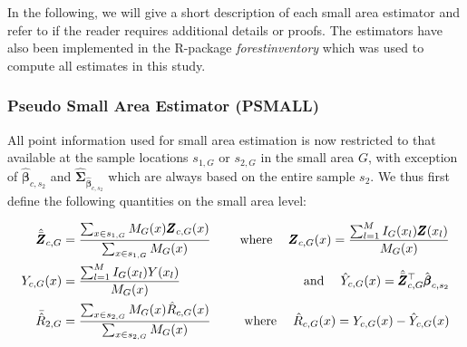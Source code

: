 \documentclass[remotesensing,article,submit,moreauthors,pdftex,10pt,a4paper]{mdpi}
\newcommand{\psmall}{PSMALL}
\begin{document}
In the following, we will give a short description of each small area estimator and refer to \citet{mandallaz2013a, mandallaz2016, mandallaz2013b} if the reader requires additional details or proofs. The estimators have also been implemented in the R-package \textit{forestinventory} \citep{forestinventory} which was used to compute all estimates in this study.\\



\subsubsection{Pseudo Small Area Estimator (\psmall{})}
\label{sec:psmall}

All point information used for small area estimation is now restricted to that available at the sample locations $s_{1,G}$ or $s_{2,G}$ in the small area $G$, with exception of $\hat{\pmb{\beta}}_{c,s_2}$ and $\hat{\pmb{\Sigma}}_{\hat{\pmb{\beta}}_{c,s_2}}$ which are always based on the entire sample $s_2$. We thus first define the following quantities on the small area level:

\begin{subequations}\label{eq:compsG}
	\begin{align}
	\hat{\bar{\pmb{Z}}}_{c,G} &= \frac{\sum_{x \in s_{1,G}} M_{G}(x) \pmb{Z}_{c,G}(x)}{\sum_{x \in s_{1,G}} M_{G}(x)} \label{eq:meanZcG} \hspace{3ex} &\text{where} \hspace{3ex}
	\pmb{Z}_{c,G}(x) =  \frac{\sum_{l=1}^{M} I_{G}(x_l)\pmb{Z}(x_l)}{M_{G}(x)}\\		
	Y_{c,G}(x) &= \frac{\sum_{l=1}^{M} I_{G}(x_l)Y(x_l)}{M_{G}(x)}  &\text{and} \hspace{3ex}
	\hat{Y}_{c,G}(x)=\hat{\bar{\pmb{Z}}}_{c,G}^{\top}\hat{\pmb{\beta}}_{c,s_2}\\
	\bar{\hat{R}}_{2,G} &= \frac{\sum_{x \in s_{2,G}} M_{G}(x) \hat{R}_{c,G}(x)}{\sum_{x \in s_{2,G}} M_{G}(x)} \hspace{3ex} &\text{where} \hspace{3ex}
	\hat{R}_{c,G}(x) = Y_{c,G}(x)-\hat{Y}_{c,G}(x)
	\end{align}
\end{subequations}
\end{document}
